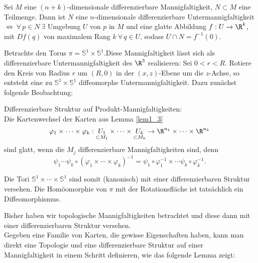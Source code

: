 \begin{thm}
	Sei $M$ eine $(n+k)$-dimensionale differenzierbare Mannigfaltigkeit, $ N \subset M$ eine Teilmenge. Dann ist $N$ eine $n$-dimensionale differenzierbare Untermannigfaltigkeit $ \iff \ \forall\, p \in N \ \exists $ Umgebung $U$ von $p$ in $M$ und eine glatte Abbildung $ f: U \to \R^k$, mit $ Df(q) $ von maximalem Rang $k\ \forall\, q \in U$, sodass $ U \cap N = f^{-1}(0). $
\end{thm}
\addtocounter{lecture}{1}
\begin{exmp*}
	Betrachte den Torus $ \pi = \mathbb{S}^1 \times \mathbb{S}^1 $.Diese Mannigfaltigkeit lässt sich als differenzierbare Untermannigfaltigkeit des $\R^3$ realisieren: Sei $ 0 < r < R $. Rotiere den Kreis von Radius $r$ um $ (R,0) $ in der $(x,z)$-Ebene um die $z$-Achse, so entsteht eine zu $ \mathbb{S}^1 \times \mathbb{S}^1 $ diffeomorphe Untermannigfaltigkeit. Dazu zunächst folgende Beobachtung:
	\begin{rem}
		Differenzierbare Struktur auf Produkt-Mannigfaltigkeiten:\\
		Die Kartenwechsel der Karten aus Lemma \ref{lem1_3} 
		\[ \varphi_1 \times \dotsm \times \varphi_k: \underset{\subset M_1}{U_1} \times \dotsm \times \underset{\subset M_k}{U_k} \to \R^{n_1} \times \dotsm \times \R^{n_k} \]
		sind glatt, wenn die $M_j$ differenzierbare Mannigfaltigkeiten sind, denn 
		\[ \psi_1 \dotsm \psi_k \circ (\varphi_1 \times \dotsm \times \varphi_k)^{-1} = \psi_1 \circ \varphi_1^{-1} \times \dotsm \psi_k \circ \varphi_k^{-1}. \]
	\end{rem}
	Die Tori $ \mathbb{S}^1 \times \dotsm \times \mathbb{S}^1 $ sind somit (kanonisch) mit einer differenzierbaren Struktur versehen. Die Homöomorphie von $\pi$ mit der Rotationsfläche ist tatsächlich ein Diffeomorphismus.
\end{exmp*}

\begin{rem*}
	Bisher haben wir topologische Mannigfaltigkeiten betrachtet und diese dann mit einer differenzierbaren Struktur versehen.\\
	Gegeben eine Familie von Karten, die gewisse Eigenschaften haben, kann man direkt eine Topologie und eine differenzierbare Struktur auf einer Mannigfaltigkeit in einem Schritt definieren, wie das folgende Lemma zeigt:
\end{rem*}

